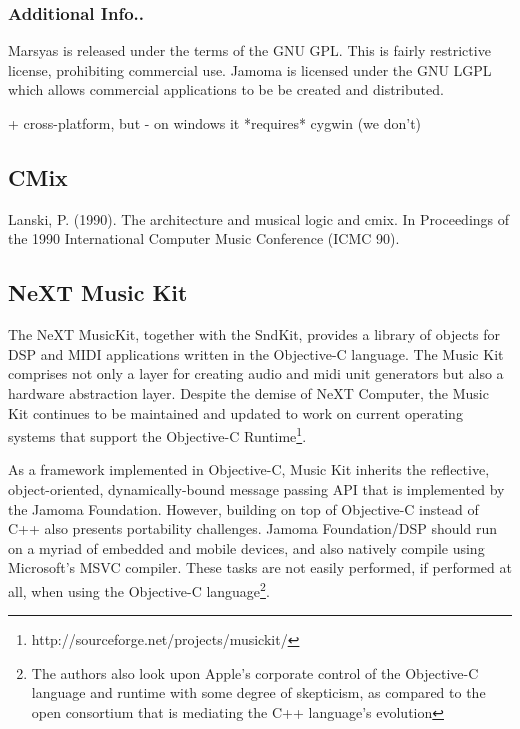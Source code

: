 \documentclass[twoside,10pt]{article}
\begin{document}
\subsubsection{Additional Info..}

Marsyas is released under the terms of the GNU GPL.  This is fairly restrictive license, prohibiting commercial use.  Jamoma is licensed under the GNU LGPL which allows commercial applications to be be created and distributed.

+ cross-platform, but 
- on windows it *requires* cygwin (we don't)

% 


\subsection{CMix} %

Lanski, P. (1990). The architecture and musical logic and cmix.
In Proceedings of the 1990 International Computer Music
Conference (ICMC 90).


\subsection{NeXT Music Kit} %

The NeXT MusicKit, together with the SndKit, provides a library of objects for DSP and MIDI applications written in the Objective-C language\cite{Jaffe:1989,Jaffe:1991}.  The Music Kit comprises not only a layer for creating audio and midi unit generators but also a hardware abstraction layer.  Despite the demise of NeXT Computer, the Music Kit continues to be maintained and updated to work on current operating systems that support the Objective-C Runtime\footnote{http://sourceforge.net/projects/musickit/}.

As a framework implemented in Objective-C, Music Kit inherits the reflective, object-oriented, dynamically-bound message passing API that is implemented by the Jamoma Foundation.  However, building on top of Objective-C instead of C++ also presents portability challenges.  Jamoma Foundation/DSP should run on a myriad of embedded and mobile devices, and also natively compile using Microsoft's MSVC compiler.  These tasks are not easily performed, if performed at all, when using the Objective-C language\footnote{The authors also look upon Apple's corporate control of the Objective-C language and runtime with some degree of skepticism, as compared to the open consortium that is mediating the C++ language's evolution}.
\end{document}
